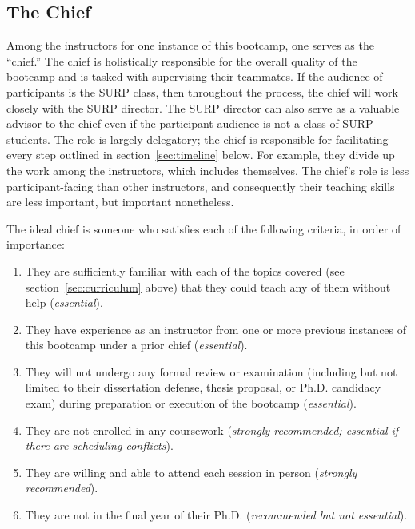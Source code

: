 \subsection{The Chief}
\label{sec:instructors:chief}
\noindent
Among the instructors for one instance of this bootcamp, one serves as the
``chief.''
The chief is holistically responsible for the overall quality of the bootcamp
and is tasked with supervising their teammates.
If the audience of participants is the SURP class, then throughout the process,
the chief will work closely with the SURP director.
The SURP director can also serve as a valuable advisor to the chief even if the
participant audience is not a class of SURP students.
The role is largely delegatory; the chief is responsible for facilitating
every step outlined in section~\ref{sec:timeline} below.
For example, they divide up the work among the instructors, which includes
themselves.
The chief’s role is less participant-facing than other instructors, and
consequently their teaching skills are less important, but important
nonetheless.
\par
The ideal chief is someone who satisfies each of the following criteria, in
order of importance:
\begin{enumerate}[topsep=0pt, itemsep=0pt, partopsep=0pt, parsep=0pt]

	\item They are sufficiently familiar with each of the topics covered (see
	section~\ref{sec:curriculum} above) that they could teach any of them
	without help (\textit{essential}).

	\item They have experience as an instructor from one or more previous
	instances of this bootcamp under a prior chief (\textit{essential}).

	\item They will not undergo any formal review or examination (including but
	not limited to their dissertation defense, thesis proposal, or Ph.D.
	candidacy exam) during preparation or execution of the bootcamp
	(\textit{essential}).

	\item They are not enrolled in any coursework (\textit{strongly
	recommended; essential if there are scheduling conflicts}).

	\item They are willing and able to attend each session in person
	(\textit{strongly recommended}).

	\item They are not in the final year of their Ph.D. (\textit{recommended
	but not essential}).
\end{enumerate}
